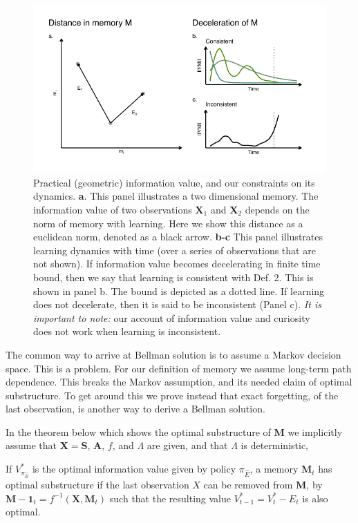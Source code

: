 \begin{figure}
	\includegraphics[width=1\linewidth]{img/cartoon.pdf} 
	\caption{Practical (geometric) information value, and our constraints on its dynamics. 
	\textbf{a}. This panel illustrates a two dimensional memory. The information value of two observations $\mathbf{X}_1$ and $\mathbf{X}_2$ depends on the norm of memory with learning. Here we show this distance as a euclidean norm, denoted as a black arrow.
	\textbf{b-c} This panel illustrates learning dynamics with time (over a series of observations that are not shown). If information value becomes decelerating in finite time bound, then we say that learning is consistent with Def. 2. This is shown in panel b. The bound is depicted as a dotted line. If learning does not decelerate, then it is said to be inconsistent (Panel c). \textit{It is important to note:} our account of information value and curiosity does not work when learning is inconsistent.
  	}
	\label{fig:cartoon} 
\end{figure}

The common way to arrive at Bellman solution is to assume a Markov decision space. This is a problem. For our definition of memory we assume long-term path dependence. This breaks the Markov assumption, and its needed claim of optimal substructure. To get around this we prove instead that exact forgetting, of the last observation, is another way to derive a Bellman solution.

In the theorem below which shows the optimal substructure of $\mathbf{M}$ we implicitly assume that $\mathbf{X} = \mathbf{S}$, $\mathbf{A}$, $f$, and $\Lambda$ are given, and that $\Lambda$ is deterministic, 

\begin{theorem} \label{theorem:opt_sub} 
   If $V^*_{\pi_{\hat E}}$ is the optimal information value given by policy $\pi_{\hat E}$, a memory $\mathbf{M}_t$ has optimal substructure if the last observation $X$ can be removed from $\mathbf{M}$, by $\mathbf{M-1}_{t} = f^{-1}(\mathbf{X}, \mathbf{M}_t)$ such that the resulting value $V^*_{t-1} = V^*_{t} - E_{t}$ is also optimal. 
\end{theorem}

